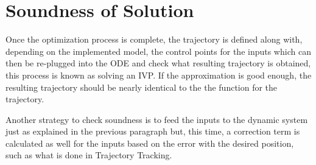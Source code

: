 \section{Soundness of Solution}
\label{sec:ivproblem}

\par Once the optimization process is complete, the trajectory is defined along with, depending on the implemented model, the control points for the inputs which can then be re-plugged into the \ac{ODE} and check what resulting trajectory is obtained, this process is known as solving an \ac{IVP}. If the approximation is good enough, the resulting trajectory should be nearly identical to the the function for the trajectory. 
\par Another strategy to check soundness is to feed the inputs to the dynamic system just as explained in the previous paragraph but, this time, a correction term is calculated as well for the inputs based on the error with the desired position, such as what is done in Trajectory Tracking.
